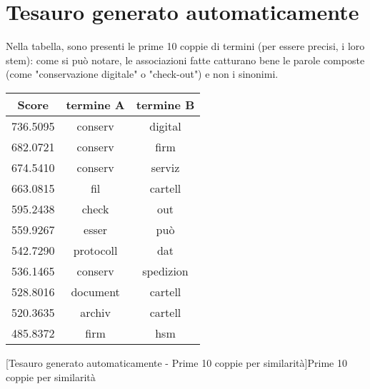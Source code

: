 \chapter{Tesauro generato automaticamente}
Nella tabella, sono presenti le prime 10 coppie di termini (per essere precisi, i loro stem): come si può notare, le associazioni fatte catturano bene le parole composte (come "conservazione digitale" o "check-out") e non i sinonimi.

\begin{center}
    \begin{tabular}{ccc}
        \toprule
        Score & termine A & termine B \\
        \midrule
        736.5095 & conserv & digital\\ 
        682.0721 & conserv & firm\\ 
        674.5410 & conserv & serviz\\ 
        663.0815 & fil & cartell\\ 
        595.2438 & check & out\\ 
        559.9267 & esser & può\\ 
        542.7290 & protocoll & dat\\ 
        536.1465 & conserv & spedizion\\ 
        528.8016 & document & cartell\\ 
        520.3635 & archiv & cartell\\ 
        485.8372 & firm & hsm\\ 
        \bottomrule
\end{tabular}
[Tesauro generato automaticamente - Prime 10 coppie per similarità]{Prime 10 coppie per similarità} 
\label{tab:tesAutoGen10Sim}
\end{center}